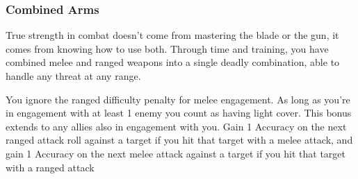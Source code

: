 \subsubsection{Combined Arms}

\begin{talent}
{True strength in combat doesn't come from mastering the blade or the gun, it comes from knowing how to use both. Through time and training, you have combined melee and ranged weapons into a single deadly combination, able to handle any threat at any range.}

You ignore the ranged difficulty penalty for melee engagement. 
As long as you're in engagement with at least 1 enemy you count as having light cover. This bonus extends to any allies also in engagement with you. 
Gain 1 Accuracy on the next ranged attack roll against a target if you hit that target with a melee attack, and gain 1 Accuracy on the next melee attack against a target if you hit that target with a ranged attack
\end{talent}